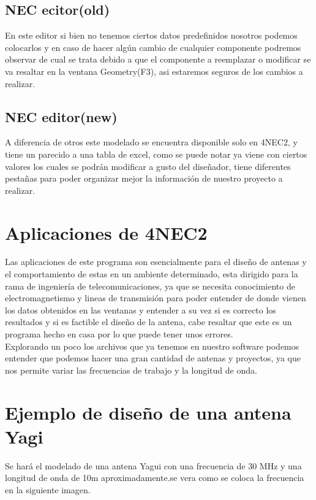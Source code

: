 \documentclass[11pt,a4paper]{article}
\begin{document}
\subsection{NEC ecitor(old)}\label{sec:3.4}
En este editor si bien no tenemos ciertos datos predefinidos nosotros podemos colocarlos y en caso de hacer alg\'un cambio de cualquier componente podremos observar de cual se trata debido a que el componente a reemplazar o modificar se va resaltar en la ventana Geometry(F3), asi estaremos seguros de los cambios a realizar.

\subsection{NEC editor(new)}\label{sec:3.5}
A diferencia de otros este modelado se encuentra disponible solo en 4NEC2, y tiene un parecido a una tabla de excel, como se puede notar ya viene con ciertos valores los cuales se podr\'an modificar a gusto del diseñador, tiene diferentes pestañas para poder organizar mejor la informaci\'on de nuestro proyecto a realizar.

\section{Aplicaciones de 4NEC2}\label{sec:4}

Las aplicaciones de este programa son esencialmente para el diseño de antenas y el comportamiento de estas en un ambiente determinado, esta dirigido para la rama de ingeniería de telecomunicaciones, ya que se necesita conocimiento de electromagnetismo y lineas de transmisión para poder entender de donde vienen los datos obtenidos en las ventanas y entender a su vez si es correcto los resultados y si es factible el diseño de la antena, cabe resaltar que este es un programa hecho en casa por lo que puede tener unos errores.\\
Explorando un poco los archivos que ya tenemos en nuestro software podemos entender que podemos hacer una gran cantidad de antenas y proyectos, ya que nos permite variar las frecuencias de trabajo y la longitud de onda.

\section{Ejemplo de diseño de una antena Yagi}\label{sec:5}
Se hará el modelado de una antena Yagui con una frecuencia de 30 MHz y una longitud de onda de 10m aproximadamente.se vera como se coloca la frecuencia en la siguiente imagen.
\end{document}
